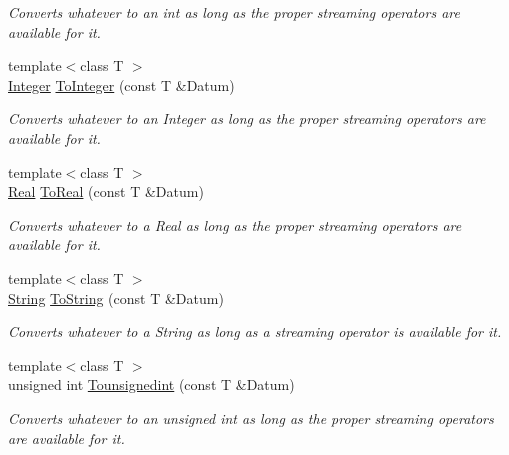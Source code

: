 \begin{DoxyCompactItemize}
\begin{DoxyCompactList}\small\item\em Converts whatever to an int as long as the proper streaming operators are available for it. \item\end{DoxyCompactList}\item 
{\footnotesize template$<$class T $>$ }\\\hyperlink{namespaceMezzanine_ac3576e52af3c62d13dde94829e0c5465}{Integer} \hyperlink{namespaceMezzanine_a7105ab0353c89b20aff864c637b905d2}{ToInteger} (const T \&Datum)
\begin{DoxyCompactList}\small\item\em Converts whatever to an Integer as long as the proper streaming operators are available for it. \item\end{DoxyCompactList}\item 
{\footnotesize template$<$class T $>$ }\\\hyperlink{namespaceMezzanine_a726731b1a7df72bf3583e4a97282c6f6}{Real} \hyperlink{namespaceMezzanine_af7cf17f4a378b989eacb874a6a879f41}{ToReal} (const T \&Datum)
\begin{DoxyCompactList}\small\item\em Converts whatever to a Real as long as the proper streaming operators are available for it. \item\end{DoxyCompactList}\item 
{\footnotesize template$<$class T $>$ }\\\hyperlink{namespaceMezzanine_acf9fcc130e6ebf08e3d8491aebcf1c86}{String} \hyperlink{namespaceMezzanine_a206e6571c4a738a16f9d103205c235f8}{ToString} (const T \&Datum)
\begin{DoxyCompactList}\small\item\em Converts whatever to a String as long as a streaming operator is available for it. \item\end{DoxyCompactList}\item 
{\footnotesize template$<$class T $>$ }\\unsigned int \hyperlink{namespaceMezzanine_a39068f48126065146fa64fe90e459382}{Tounsignedint} (const T \&Datum)
\begin{DoxyCompactList}\small\item\em Converts whatever to an unsigned int as long as the proper streaming operators are available for it. \item\end{DoxyCompactList}\item 

\end{DoxyCompactItemize}
